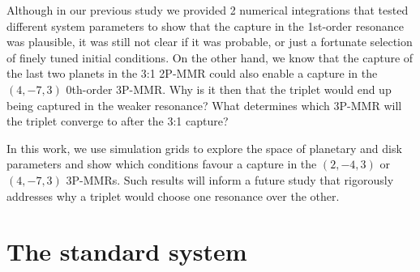 \documentclass[baaa]{baaa}
\begin{document}

Although in our previous study we provided 2 numerical integrations that tested different system parameters to show that the capture in the 1st-order resonance was plausible, it was still not clear if it was probable, or just a fortunate selection of finely tuned initial conditions.
On the other hand, we know that the capture of the last two planets in the 3:1 2P-MMR could also enable a capture in the $(4,-7,3)$ 0th-order 3P-MMR.
Why is it then that the triplet would end up being captured in the weaker resonance?
What determines which 3P-MMR will the triplet converge to after the 3:1 capture?


In this work, we use simulation grids to explore the space of planetary and disk parameters and show which conditions favour a capture in the $(2,-4,3)$ or $(4,-7,3)$ 3P-MMRs.
Such results will inform a future study that rigorously addresses why a triplet would choose one resonance over the other. 





\section{The standard system}
\end{document}
